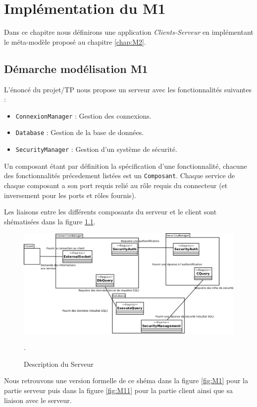 \chapter{Implémentation du M1}\label{chap:M1}
Dans ce chapitre nous définirons une application \textit{Clients-Serveur} en implémentant le méta-modèle proposé au chapitre \ref{chap:M2}.

\section{Démarche modélisation M1}
L'énoncé du projet/TP nous propose un serveur avec les fonctionnalités suivantes :

\begin{itemize}
\item \verb+ConnexionManager+ :   Gestion des connexions. 
\item  \verb+Database+ :  Gestion de la base de données.
\item \verb+SecurityManager+ :  Gestion d'un système de sécurité.
\end{itemize}

Un composant étant par définition la spécification d'une fonctionnalité, chacune des fonctionnalités précedement listées est un \verb+Composant+. Chaque service de chaque composant a son port requis relié au rôle requis  du connecteur (et inversement pour les ports et rôles fournis).

Les liaisons entre les différents composants du serveur et le client sont shématisées dans la figure \ref{fig:desSer}. 
\begin{figure}[htb]
  \centering
  \includegraphics[scale=0.32]{img/DescribServeur}
  \caption{Description du Serveur}
  \label{fig:desSer}.
\end{figure}

Nous retrouvons une version formelle de ce shéma dans la figure \ref{fig:M1} pour la partie \og serveur \fg{} puis dans la figure \ref{fig:M11} pour la partie \og client \fg{} ainsi que sa liaison avec le serveur.

